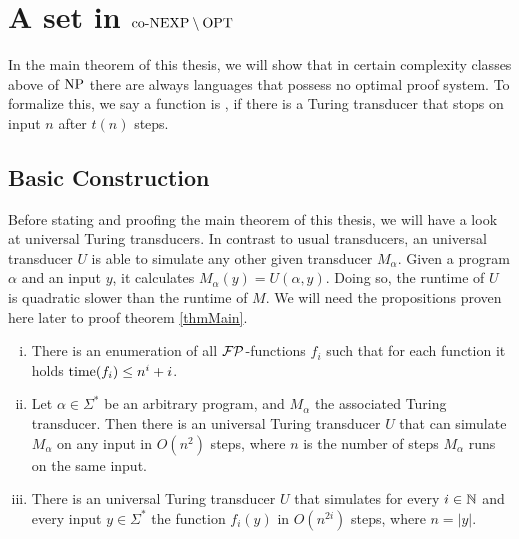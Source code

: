 \chapter{A set in $\text{co-NEXP} \setminus \text{OPT}$} \label{chpConexpMinusOpt}
  In the main theorem of this thesis, we will show that in certain complexity classes above of \(\text{NP}\) there are always languages that possess no optimal proof system. To formalize this, we say a function is , if there is a Turing transducer that stops on input \(n\) after \(t(n)\) steps.

  \section{Basic Construction}
  
  Before stating and proofing the main theorem of this thesis, we will have a look at universal Turing transducers. In contrast to usual transducers, an universal transducer \(U\) is able to simulate any other given transducer \(M_\alpha\). Given a program \(\alpha\) and an input \(y\), it calculates \(M_\alpha(y) = U(\alpha, y)\). Doing so, the runtime of \(U\) is quadratic slower than the runtime of \(M\). We will need the propositions proven here later to proof theorem \ref{thmMain}.
  
  \begin{lemma}\label{lemSimulation}
    \begin{enumerate}[(i)]
     \item There is an enumeration of all \(\mathcal{FP}\)-functions \(f_i\) such that for each function it holds \(\operatorname{time}(f_i) \leq n^i + i\).
     \item Let \(\alpha \in \Sigma^*\) be an arbitrary program, and \(M_\alpha\) the associated Turing transducer. Then there is an universal Turing transducer \(U\) that can simulate \(M_\alpha\) on any input in \(O(n^2)\) steps, where \(n\) is the number of steps \(M_\alpha\) runs on the same input.
     \item There is an universal Turing transducer \(U\) that simulates for every \(i \in \mathbb{N}\) and every input \(y \in \Sigma^*\) the function \(f_i(y)\) in \(O(n^{2i})\) steps, where \(n = |y|\).
    \end{enumerate}
  \end{lemma}
  
